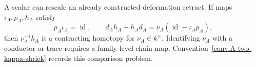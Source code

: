 \documentclass[11pt]{memoir}
\begin{document}
A scalar can rescale an already constructed deformation retract.  If
maps $\iota_A,p_A,h_A$ satisfy
\[
 p_A\iota_A=\operatorname{id},
 \qquad
 d_Ah_A+h_Ad_A
 =\nu_A(\operatorname{id}-\iota_Ap_A),
\]
then $\nu_A^{-1}h_A$ is a contracting homotopy for
$\nu_A\in k^\times$.  Identifying $\nu_A$ with a conductor or trace
requires a family-level chain map.  Convention~\ref{conv:A-two-kappa-shriek}
records this comparison problem.





% 
\clearpage




\clearpage









\end{document}
